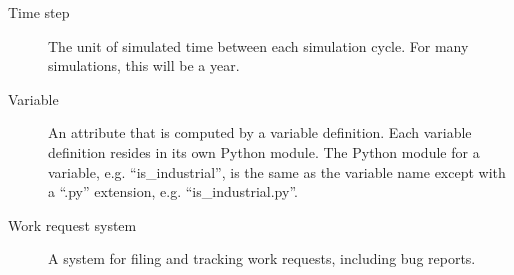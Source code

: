 \begin{description}
\item[Time step] 
The unit of simulated time between each simulation cycle. For many
simulations, this will be a year.

\item[Variable]
An attribute that is computed by a variable definition.  Each
variable definition resides in its own Python module.  The 
Python module for a variable, e.g. ``is_industrial'', is the
same as the variable name except with a ``.py'' extension, 
e.g. ``is_industrial.py''.  

\item[Work request system] 
A system for filing and tracking work requests, including bug
reports.

\end{description}
